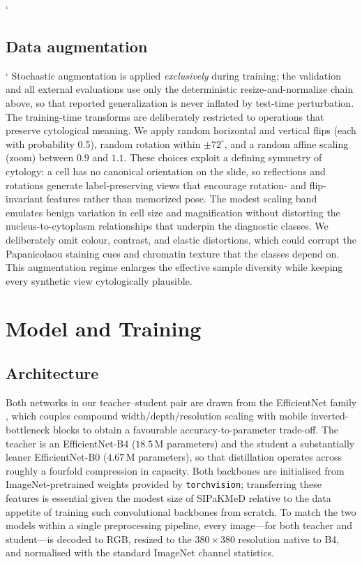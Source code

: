 \documentclass[twocolumn]{article}
\begin{document}
`\subsection{Data augmentation}`
Stochastic augmentation is applied \emph{exclusively} during training; the validation and all external evaluations use only the deterministic resize-and-normalize chain above, so that reported generalization is never inflated by test-time perturbation. The training-time transforms are deliberately restricted to operations that preserve cytological meaning. We apply random horizontal and vertical flips (each with probability 0.5), random rotation within $\pm72^{\circ}$, and a random affine scaling (zoom) between $0.9$ and $1.1$. These choices exploit a defining symmetry of cytology: a cell has no canonical orientation on the slide, so reflections and rotations generate label-preserving views that encourage rotation- and flip-invariant features rather than memorized pose. The modest scaling band emulates benign variation in cell size and magnification without distorting the nucleus-to-cytoplasm relationships that underpin the diagnostic classes. We deliberately omit colour, contrast, and elastic distortions, which could corrupt the Papanicolaou staining cues and chromatin texture that the classes depend on. This augmentation regime enlarges the effective sample diversity while keeping every synthetic view cytologically plausible.

\section{Model and Training}

\subsection{Architecture}
Both networks in our teacher--student pair are drawn from the EfficientNet family \citep{tan2019efficientnet}, which couples compound width/depth/resolution scaling with mobile inverted-bottleneck blocks to obtain a favourable accuracy-to-parameter trade-off. The teacher is an EfficientNet-B4 ($18.5$\,M parameters) and the student a substantially leaner EfficientNet-B0 ($4.67$\,M parameters), so that distillation operates across roughly a fourfold compression in capacity. Both backbones are initialised from ImageNet-pretrained weights \citep{deng2009imagenet} provided by \texttt{torchvision}; transferring these features is essential given the modest size of SIPaKMeD relative to the data appetite of training such convolutional backbones from scratch. To match the two models within a single preprocessing pipeline, every image---for both teacher and student---is decoded to RGB, resized to the $380\times380$ resolution native to B4, and normalised with the standard ImageNet channel statistics.
\end{document}
